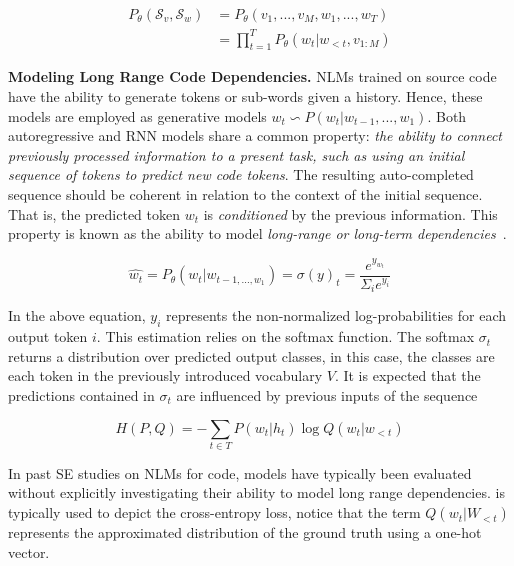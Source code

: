 \begin{equation}
\begin{split}
P_{\theta}(\mathcal{S}_v,\mathcal{S}_w) & = P_{\theta}(v_1,...,v_M,w_1,...,w_T) \\
                        & = \prod_{t = 1}^{T} P_{\theta}(w_t | w_{<t}, v_{1:M} )
\end{split}
\label{eq:llmML}
\end{equation}

\textbf{Modeling Long Range Code Dependencies.} NLMs trained on source code have the ability to generate tokens or sub-words given a history. Hence, these models are employed as generative models $w_t  \backsim P(w_t | w_{t-1},...,w_1 )$. Both autoregressive and RNN models share a common property: \textit{the ability to connect previously processed information to a present task, such as using an initial sequence of tokens to predict new code tokens}. The resulting auto-completed sequence should be coherent in relation to the context of the initial sequence. That is, the predicted token $w_t$ is \textit{conditioned} by the previous information. This property is known as the ability to model \textit{long-range or long-term dependencies}~\citep{karpathy2015understand}.

\begin{equation}
\hat{w_t} = P_{\theta}(w_t | w_{t-1,...,w_1} ) = \sigma(y)_t = \frac{e^{y_{w_t}}}{\Sigma_i e^{y_i}}
\label{eq:long}
\end{equation}

\noindent In the above equation, $y_i$ represents the non-normalized log-probabilities for each output token $i$. This estimation relies on the softmax function. The softmax $\sigma_t$ returns a distribution over predicted output classes, in this case, the classes are each token in the previously introduced vocabulary $V$. 
It is expected that the predictions contained in $\sigma_t$ are influenced by previous inputs of the sequence 

\begin{equation}
H(P,Q) = - \sum_{t \in T} P(w_t | h_t) \log Q(w_t | w_{<t})
\label{eq:cross}
\end{equation}

In past SE studies on NLMs for code, models have typically been evaluated without explicitly investigating their ability to model long range dependencies.  is typically used to depict the cross-entropy loss, notice that the term $Q(w_t| W_{<t})$ represents the approximated distribution of the ground truth using a one-hot vector.